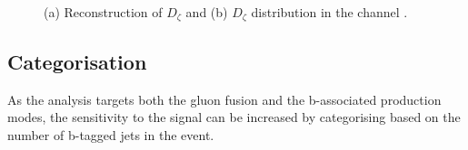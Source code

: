 \begin{figure}[h!]
\begin{center}
\end{center}
\caption[Reconstruction of the $D_{\zeta}$ variable and the $D_{\zeta}$ distribution
in the \emu channel.]{(a) Reconstruction of $D_{\zeta}$ \cite{cdf-dzeta} and (b) $D_{\zeta}$ distribution in the 
\emu channel \cite{CMS-PAS-HIG-16-037}.}
\label{fig:mssm_dzeta}
\end{figure}

\subsection{Categorisation}
\label{sec:mssm_eventsel_categories}
As the analysis targets both the gluon fusion
and the b-associated production modes, 
the sensitivity to the signal can be increased by categorising
based on the number of b-tagged jets in the event.

